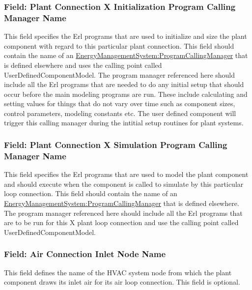 \subsubsection{Field: Plant Connection X Initialization Program Calling Manager Name}\label{field-plant-connection-x-initialization-program-calling-manager-name}

This field specifies the Erl programs that are used to initialize and size the plant component with regard to this particular plant connection. This field should contain the name of an \hyperref[energymanagementsystemprogramcallingmanager]{EnergyManagementSystem:ProgramCallingManager} that is defined elsewhere and uses the calling point called UserDefinedComponentModel. The program manager referenced here should include all the Erl programs that are needed to do any initial setup that should occur before the main modeling programs are run. These include calculating and setting values for things that do not vary over time such as component sizes, control parameters, modeling constants etc. The user defined component will trigger this calling manager during the intitial setup routines for plant systems.

\subsubsection{Field: Plant Connection X Simulation Program Calling Manager Name}\label{field-plant-connection-x-simulation-program-calling-manager-name}

This field specifies the Erl programs that are used to model the plant component and should execute when the component is called to simulate by this particular loop connection. This field should contain the name of an \hyperref[energymanagementsystemprogramcallingmanager]{EnergyManagementSystem:ProgramCallingManager} that is defined elsewhere. The program manager referenced here should include all the Erl programs that are to be run for this X plant loop connection and use the calling point called UserDefinedComponentModel.

\subsubsection{Field: Air Connection Inlet Node Name}\label{field-air-connection-inlet-node-name}

This field defines the name of the HVAC system node from which the plant component draws its inlet air for its air loop connection. This field is optional.

